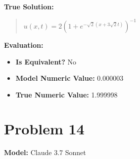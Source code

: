 \documentclass{article}
\begin{document}
\textbf{True Solution:}
\begin{quote}
$u(x, t) = 2(1 + e^{-\sqrt{2}(x + 3\sqrt{2}t)})^{-1}$
\end{quote}

\textbf{Evaluation:}
\begin{itemize}
\item \textbf{Is Equivalent?} No
\item \textbf{Model Numeric Value:} 0.000003
\item \textbf{True Numeric Value:} 1.999998
\end{itemize}
\vspace{1cm}
\section*{Problem 14}
\textbf{Model:} Claude 3.7 Sonnet
\end{document}
